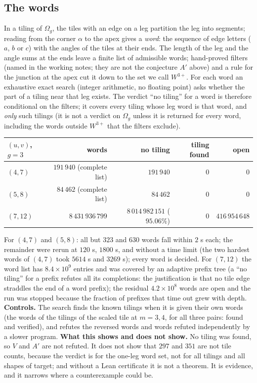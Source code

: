 \documentclass[11pt,reqno]{amsart}
\theoremstyle{plain}
\theoremstyle{definition}
\begin{document}
\subsection{The words}
In a tiling of $\Omega_g$, the tiles with an edge on a leg partition the leg into segments; reading from the corner $\alpha$ to the apex gives a \emph{word}: the sequence of edge letters ($a$, $b$ or $c$) with the angles of the tiles at their ends.
The length of the leg and the angle sums at the ends leave a finite list of admissible words; hand-proved filters (named in the working notes; they are not the conjecture $A'$ above) and a rule for the junction at the apex cut it down to the set we call \emph{$W^{3+}$}.
For each word an exhaustive exact search (integer arithmetic, no floating point) asks whether the part of a tiling near that leg exists.
The verdict ``no tiling'' for a word is therefore conditional on the filters; it covers every tiling whose leg word is that word, and \emph{only} such tilings (it is not a verdict on $\Omega_g$ unless it is returned for every word, including the words outside $W^{3+}$ that the filters exclude).
\begin{center}\small
\begin{tabular}{@{}lrrrr@{}}
\toprule
$(u,v)$, $g=3$ & words & no tiling & tiling found & open\\
\midrule
$(4,7)$ & $191\,940$ (complete list) & $191\,940$ & $0$ & $0$\\
$(5,8)$ & $84\,462$ (complete list) & $84\,462$ & $0$ & $0$\\
$(7,12)$ & $8\,431\,936\,799$ & $8\,014\,982\,151$ ($95.06\%$) & $0$ & $416\,954\,648$\\
\bottomrule
\end{tabular}
\end{center}
For $(4,7)$ and $(5,8)$: all but $323$ and $630$ words fall within $2$ s each; the remainder were rerun at $120$ s, $1800$ s, and without a time limit (the two hardest words of $(4,7)$ took $5614$ s and $3269$ s); every word is decided.
For $(7,12)$ the word list has $8.4\times10^9$ entries and was covered by an adaptive prefix tree (a ``no tiling'' for a prefix refutes all its completions: the justification is that no tile edge straddles the end of a word prefix); the residual $4.2\times10^8$ words are open and the run was stopped because the fraction of prefixes that time out grew with depth.
\textbf{Controls.} The search finds the known tilings when it is given their own words (the words of the tilings of the scaled tile at $m=3,4$, for all three pairs: found and verified), and refutes the reversed words and words refuted independently by a slower program.
\textbf{What this shows and does not show.} No tiling was found, so $V$ and $A'$ are not refuted. It does not show that $297$ and $351$ are not tile counts, because the verdict is for the one-leg word set, not for all tilings and all shapes of target; and without a Lean certificate it is not a theorem. It is evidence, and it narrows where a counterexample could be.
\end{document}
